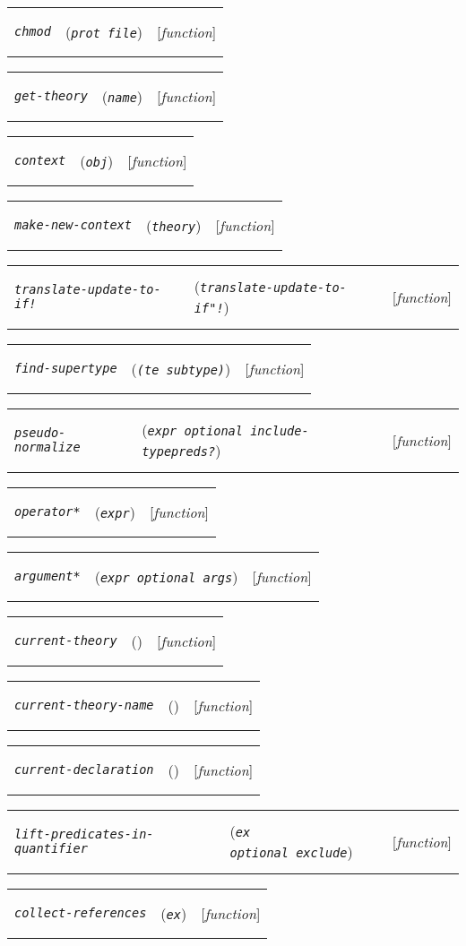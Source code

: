 \documentclass[12pt]{book}
\makeatletter
\def\ampoptional{{\smaller\sc {\smaller\smaller \&}optional\ }}
\newenvironment{function}[3]%
{\par\noindent\begin{boxedminipage}{\textwidth}%
 \par\noindent\begin{tabularx}{\linewidth}{l>{\raggedright}Xr}%
 \functionhtgt{#1}&(\texttt{\textit{#2}})&[\emph{#3}]%
 \end{tabularx}\par\flushright\begin{minipage}{.97\textwidth}}
{\end{minipage}\end{boxedminipage}}
\newcommand{\functionnm}[1]{\texttt{\textit{#1}}}
\newcommand{\functionhtgt}[1]{\hypertarget{#1}{\functionnm{#1}}\index{#1@\functionnm{#1}|underline}}
\newenvironment{lispfunction}[2]%
{\begin{function}{#1}{#2}{function}}{\end{function}}
\newenvironment{functioni}[3]%
{\par\noindent\begin{boxedminipage}{\textwidth}%
 \par\noindent\begin{tabularx}{\linewidth}{lXr}%
 \hypertarget{#1}{\functionnm{#1}}\index{#2@\functionnm{#2}|underline}%
   &(\texttt{\textit{#2}})&[\emph{function}]%
 \end{tabularx}\par}
{\end{boxedminipage}}
\makeatother
\begin{document}
\begin{lispfunction}{chmod}{prot file}
\end{lispfunction}

\begin{lispfunction}{get-theory}{name}
\end{lispfunction}

\begin{lispfunction}{context}{obj}
\end{lispfunction}

\begin{lispfunction}{make-new-context}{theory}
\end{lispfunction}

\begin{functioni}{translate-update-to-if!}{translate-update-to-if"!}{((expr update-expr)}
\end{functioni}

\begin{lispfunction}{find-supertype}{(te subtype)}
\end{lispfunction}

\begin{lispfunction}{pseudo-normalize}{expr \ampoptional include-typepreds?}
\end{lispfunction}

\begin{lispfunction}{operator*}{expr}
\end{lispfunction}

\begin{lispfunction}{argument*}{expr \ampoptional args}
\end{lispfunction}

\begin{lispfunction}{current-theory}{}
\end{lispfunction}

\begin{lispfunction}{current-theory-name}{}
\end{lispfunction}

\begin{lispfunction}{current-declaration}{}
\end{lispfunction}

\begin{lispfunction}{lift-predicates-in-quantifier}{ex \ampoptional exclude}
\end{lispfunction}

\begin{lispfunction}{collect-references}{ex}
\end{lispfunction}
\end{document}

